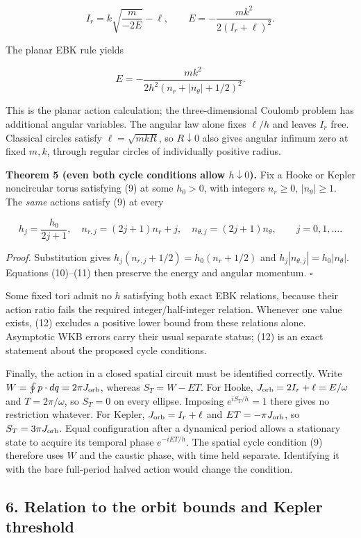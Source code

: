 \documentclass[11pt,a4paper]{article}
\begin{document}
\[
I_r=k\sqrt{\frac{m}{-2E}}-\ell,
\qquad E=-\frac{mk^2}{2(I_r+\ell)^2}. \tag{11}
\]

The planar EBK rule yields

\[E=-\frac{mk^2}{2h^2(n_r+|n_\theta|+1/2)^2}.\]

This is the planar action calculation; the three-dimensional Coulomb
problem has additional angular variables. The angular law alone fixes
\(\ell/h\) and leaves \(I_r\) free. Classical circles satisfy
\(\ell=\sqrt{mkR}\), so \(R\downarrow0\) also gives angular infimum zero
at fixed \(m,k\), through regular circles of individually positive
radius.

\textbf{Theorem 5 (even both cycle conditions allow \(h\downarrow0\)).}
Fix a Hooke or Kepler noncircular torus satisfying (9) at some
\(h_0>0\), with integers \(n_r\ge0\), \(|n_\theta|\ge1\). The
\emph{same} actions satisfy (9) at every

\[
h_j=\frac{h_0}{2j+1},\quad
n_{r,j}=(2j+1)n_r+j,\quad
n_{\theta,j}=(2j+1)n_\theta,\qquad j=0,1,\ldots . \tag{12}
\]

\emph{Proof.} Substitution gives \(h_j(n_{r,j}+1/2)=h_0(n_r+1/2)\) and
\(h_j|n_{\theta,j}|=h_0|n_\theta|\). Equations (10)--(11) then preserve
the energy and angular momentum. \(\square\)

Some fixed tori admit no \(h\) satisfying both exact EBK relations,
because their action ratio fails the required integer/half-integer
relation. Whenever one value exists, (12) excludes a positive lower
bound from these relations alone. Asymptotic WKB errors carry their
usual separate status; (12) is an exact statement about the proposed
cycle conditions.

Finally, the action in a closed spatial circuit must be identified
correctly. Write \(W=\oint p\cdot dq=2\pi J_{\rm orb}\), whereas
\(S_T=W-ET\). For Hooke, \(J_{\rm orb}=2I_r+\ell=E/\omega\) and
\(T=2\pi/\omega\), so \(S_T=0\) on every ellipse. Imposing
\(e^{iS_T/h}=1\) there gives no restriction whatever. For Kepler,
\(J_{\rm orb}=I_r+\ell\) and \(ET=-\pi J_{\rm orb}\), so
\(S_T=3\pi J_{\rm orb}\). Equal configuration after a dynamical period
allows a stationary state to acquire its temporal phase \(e^{-iET/h}\).
The spatial cycle condition (9) therefore uses \(W\) and the caustic
phase, with time held separate. Identifying it with the bare full-period
halved action would change the condition.

\hypertarget{relation-to-the-orbit-bounds-and-kepler-threshold}{%
\subsection{6. Relation to the orbit bounds and Kepler
threshold}\label{relation-to-the-orbit-bounds-and-kepler-threshold}}
\end{document}
